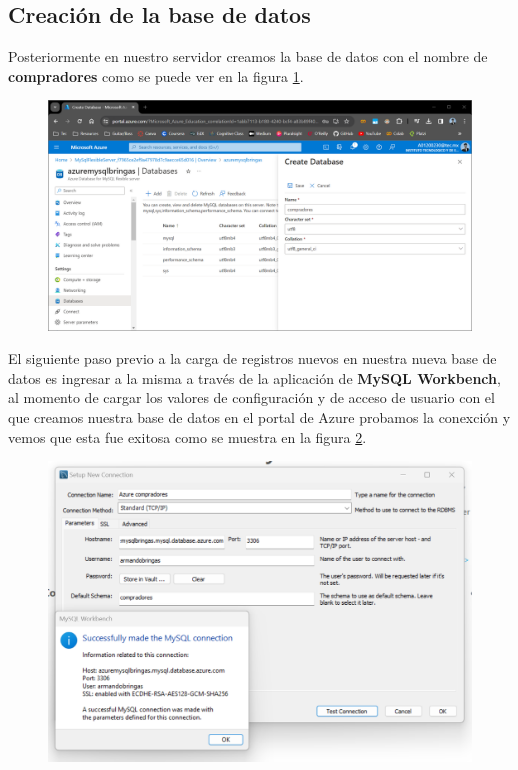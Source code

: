 \documentclass[12pt,a4paper]{article}
\begin{document}
\subsection{Creación de la base de datos}

Posteriormente en nuestro servidor creamos la base de datos con el nombre de \textbf{compradores} como se puede ver en la figura \ref{fig:1_2_1_Azure_DBMS}.

\begin{figure}[H]
    \centering
    \includegraphics[width=.7\linewidth]{M4_Servicios_Cómputo_en_la_Nube/Tarea_6_Creación_sistema_administración_Base_de_Datos/reporte/figuras/1_2_1_Azure_DBMS.png}
    \label{fig:1_2_1_Azure_DBMS}
\end{figure}

El siguiente paso previo a la carga de registros nuevos en nuestra nueva base de datos es ingresar a la misma a través de la aplicación de \textbf{MySQL Workbench}, al momento de cargar los valores de configuración y de acceso de usuario con el que creamos nuestra base de datos en el portal de Azure probamos la conexción y vemos que esta fue exitosa como se muestra en la figura \ref{fig:1_2_2_Azure_DBMS}.

\begin{figure}[H]
    \centering
    \includegraphics[width=.7\linewidth]{M4_Servicios_Cómputo_en_la_Nube/Tarea_6_Creación_sistema_administración_Base_de_Datos/reporte/figuras/1_2_2_Azure_DBMS.png}
    \label{fig:1_2_2_Azure_DBMS}
\end{figure}
\end{document}
